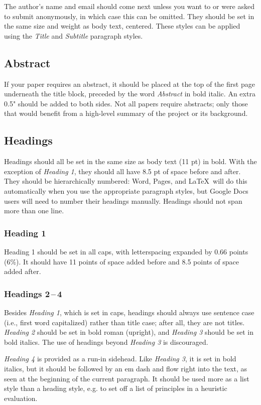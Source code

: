 \documentclass[
	letterpaper, %
]{jdf}
\begin{document}
The author’s name and email should come next unless you want to or were asked to submit anonymously, in which case this can be omitted. They should be set in the same size and weight as body text, centered. These styles can be applied using the \emph{Title} and \emph{Subtitle} paragraph styles.

\subsection{Abstract}
If your paper requires an abstract, it should be placed at the top of the first page underneath the title block, preceded by the word \emph{Abstract} in bold italic. An extra 0.5" should be added to both sides. Not all papers require abstracts; only those that would benefit from a high-level summary of the project or its background.

\subsection{Headings}
Headings should all be set in the same size as body text (11 pt) in bold. With the exception of \emph{Heading 1}, they should all have 8.5 pt of space before and after. They should be hierarchically numbered: Word, Pages, and \LaTeX\ will do this automatically when you use the appropriate paragraph styles, but Google Docs users will need to number their headings manually. Headings should not span more than one line.

\subsubsection{Heading 1}
Heading 1 should be set in all caps, with letterspacing expanded by 0.66 points (6\%). It should have 11 points of space added before and 8.5 points of space added after.

\subsubsection{Headings 2\,–\,4}
Besides \emph{Heading 1}, which is set in caps, headings should always use sentence case (i.e., first word capitalized) rather than title case; after all, they are not titles. \emph{Heading 2} should be set in bold roman (upright), and \emph{Heading 3} should be set in bold italics. The use of headings beyond \emph{Heading 3} is discouraged.

\emph{Heading 4} is provided as a run-in sidehead. Like \emph{Heading 3}, it is set in bold italics, but it should be followed by an em dash and flow right into the text, as seen at the beginning of the current paragraph. It should be used more as a list style than a heading style, e.g. to set off a list of principles in a heuristic evaluation.
\end{document}
